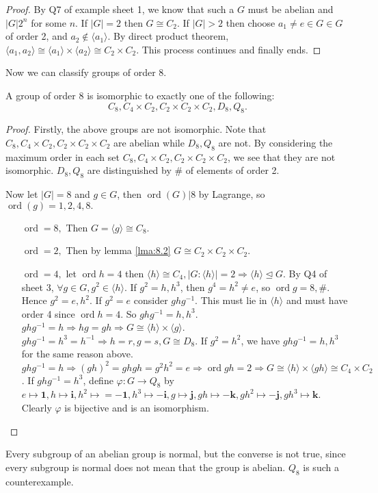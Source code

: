 \documentclass[10pt]{article}
\def\ltrigeq{\trianglelefteq}
\DeclareMathOperator{\ord}{ord}
\begin{document}
    \begin{proof}
        By Q7 of example sheet 1, we know that such a $G$ must be abelian and $|G|2^n$ for some $n$. If $|G|=2$ then $ G \cong C_2 $. If $|G|>2$ then choose $a_1\neq e\in G\in G$ of order 2, and $a_2\notin \langle a_1 \rangle $. By direct product theorem, $ \langle a_1,a_2 \rangle \cong \langle a_1 \rangle \times \langle a_2 \rangle \cong C_2\times C_2 $. This process continues and finally ends.
    \end{proof}
    Now we can classify groups of order 8.
    \begin{theorem}\label{thm:8.3}
        A group of order 8 is isomorphic to exactly one of the following:
        \[
            C_8, C_4 \times C_2,C_2 \times C_2 \times C_2, D_8, Q_8.
        \]
    \end{theorem}
    \begin{proof}
        Firstly, the above groups are not isomorphic. Note that $  C_8, C_4 \times C_2,C_2 \times C_2 \times C_2$ are abelian while $D_8, Q_8$ are not. By considering the maximum order in each set $ C_8, C_4 \times C_2,C_2 \times C_2 \times C_2 $, we see that they are not isomorphic. $D_8, Q_8$ are distinguished by \# of elements of order 2.

        Now let $ |G|=8 $ and $g\in G$, then $ \ord(G)|8 $ by Lagrange, so $ \ord(g)=1,2,4,8. $
        \begin{enumerate}[align=hang]
            \item[$ \ord=8 ,$] Then $ G=\langle g \rangle \cong C_8 $.
            \item[$ \ord=2 ,$] Then by lemma \ref{lma:8.2} $ G \cong C_2\times C_2 \times C_2 $.
            \item[$ \ord=4, $] let $\ord h=4$ then $ \langle h \rangle \cong C_4, |G:\langle h \rangle |=2 \Rightarrow \langle h \rangle \ltrigeq G $. By Q4 of sheet 3, $ \forall g\in G, g^2\in \langle h \rangle $. If $ g^2=h,h^3 $, then $ g^4=h^2\neq e $, so $ \ord g=8,\# $. Hence $g^2=e,h^2$. If $g^2=e$ consider $ ghg^{-1} $. This must lie in $ \langle h \rangle $ and must have order 4 since $\ord h=4$. So $ ghg^{-1}=h,h^3 $. $ ghg^{-1}=h \Rightarrow hg=gh \Rightarrow G \cong \langle h \rangle \times \langle g \rangle $. $ ghg^{-1}=h^3=h^{-1} \Rightarrow h=r,g=s, G \cong D_8 $. If $g^2=h^2$, we have $ ghg^{-1}=h,h^3 $ for the same reason above. $ ghg^{-1}=h \Rightarrow (gh)^2=ghgh=g^2h^2=e \Rightarrow \ord gh=2 \Rightarrow G \cong \langle h \rangle \times \langle gh \rangle \cong C_4 \times C_2 $. If $ ghg^{-1}=h^3  $, define $ \varphi: G\to Q_8 $ by $ e \mapsto \mathbf{1}, h \mapsto \mathbf{i},h^2 \mapsto =-\mathbf{1}, h^3 \mapsto - \mathbf{i}, g \mapsto \mathbf{j},gh \mapsto - \mathbf{k}, gh^2 \mapsto -\mathbf{j}, gh^3 \mapsto \mathbf{k} $. Clearly $\varphi$ is bijective and is an isomorphism.
        \end{enumerate}
    \end{proof}
    \begin{remark}
        Every subgroup of an abelian group is normal, but the converse is not true, since every subgroup is normal does not mean that the group is abelian. $ Q_8 $ is such a counterexample.
    \end{remark}
\end{document}
